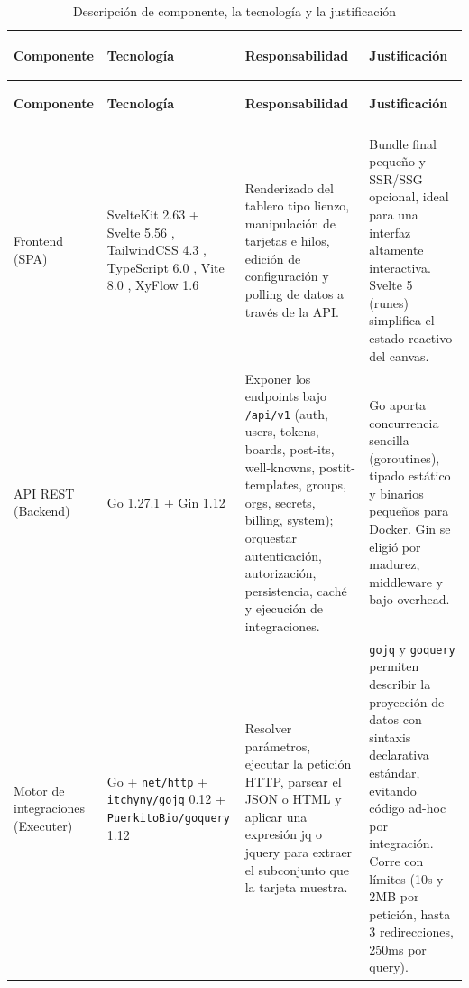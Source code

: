 \begingroup
\footnotesize
\setlength{\tabcolsep}{4.5pt}
\renewcommand{\arraystretch}{1.35}
\begin{longtable}{
  >{\bfseries\raggedright\arraybackslash}p{}
  >{\raggedright\arraybackslash}p{}
  >{\raggedright\arraybackslash}p{}
  >{\raggedright\arraybackslash}p{}
}
  \toprule
  \rowcolor{gray!18}
  \textbf{Componente} & \textbf{Tecnología} & \textbf{Responsabilidad} & \textbf{Justificación} \\
  \midrule
  \endfirsthead
  \toprule
  \rowcolor{gray!18}
  \textbf{Componente} & \textbf{Tecnología} & \textbf{Responsabilidad} & \textbf{Justificación} \\
  \midrule
  \endhead
  \midrule
  \rowcolor{white}
  \multicolumn{4}{r}{\textit{\scriptsize Continúa en la página siguiente...}} \\
  \endfoot
  \bottomrule
  \caption{Descripción de componente, la tecnología y la justificación}
  \label{tab:componentes_stack}
  \endlastfoot
  Frontend (SPA) & SvelteKit 2.63 + Svelte 5.56 \cite{svelte_docs}, TailwindCSS 4.3 \cite{tailwind_docs}, TypeScript 6.0 \cite{typescript_docs}, Vite 8.0 \cite{vite_docs}, XyFlow 1.6 \cite{xyflow_docs} & Renderizado del tablero tipo lienzo, manipulación de tarjetas e hilos, edición de configuración y polling de datos a través de la API. & Bundle final pequeño y SSR/SSG opcional, ideal para una interfaz altamente interactiva. Svelte 5 (runes) simplifica el estado reactivo del canvas. \\
  API REST (Backend) & Go 1.27.1 + Gin 1.12 \cite{gin_docs} & Exponer los endpoints bajo \texttt{/api/v1} (auth, users, tokens, boards, post-its, well-knowns, postit-templates, groups, orgs, secrets, billing, system); orquestar autenticación, autorización, persistencia, caché y ejecución de integraciones. & Go aporta concurrencia sencilla (goroutines), tipado estático y binarios pequeños para Docker. Gin se eligió por madurez, middleware y bajo overhead. \\
  Motor de integraciones (Executer) & Go + \texttt{net/http} + \texttt{itchyny/gojq} 0.12 \cite{gojq_docs} + \texttt{PuerkitoBio/goquery} 1.12 \cite{goquery_docs} & Resolver parámetros, ejecutar la petición HTTP, parsear el JSON o HTML y aplicar una expresión jq o jquery para extraer el subconjunto que la tarjeta muestra. & \texttt{gojq} y \texttt{goquery} permiten describir la proyección de datos con sintaxis declarativa estándar, evitando código ad-hoc por integración. Corre con límites (10s y 2MB por petición, hasta 3 redirecciones, 250ms por query). \\

\end{longtable}
